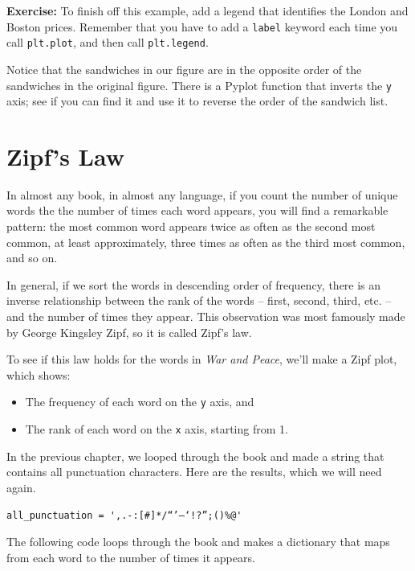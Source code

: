 \textbf{Exercise:} To finish off this example, add a legend that
identifies the London and Boston prices. Remember that you have to add a
\passthrough{\lstinline!label!} keyword each time you call
\passthrough{\lstinline!plt.plot!}, and then call
\passthrough{\lstinline!plt.legend!}.

Notice that the sandwiches in our figure are in the opposite order of
the sandwiches in the original figure. There is a Pyplot function that
inverts the \passthrough{\lstinline!y!} axis; see if you can find it and
use it to reverse the order of the sandwich list.

\hypertarget{zipfs-law}{%
\section{Zipf's Law}\label{zipfs-law}}

In almost any book, in almost any language, if you count the number of
unique words the the number of times each word appears, you will find a
remarkable pattern: the most common word appears twice as often as the
second most common, at least approximately, three times as often as the
third most common, and so on.

In general, if we sort the words in descending order of frequency, there
is an inverse relationship between the rank of the words -- first,
second, third, etc. -- and the number of times they appear. This
observation was most famously made by George Kingsley Zipf, so it is
called Zipf's law.

To see if this law holds for the words in \emph{War and Peace}, we'll
make a Zipf plot, which shows:

\begin{itemize}
\item
  The frequency of each word on the \passthrough{\lstinline!y!} axis,
  and
\item
  The rank of each word on the \passthrough{\lstinline!x!} axis,
  starting from 1.
\end{itemize}

In the previous chapter, we looped through the book and made a string
that contains all punctuation characters. Here are the results, which we
will need again.

\begin{lstlisting}[]
all_punctuation = ',.-:[#]*/“’—‘!?”;()%@'
\end{lstlisting}

The following code loops through the book and makes a dictionary that
maps from each word to the number of times it appears.

